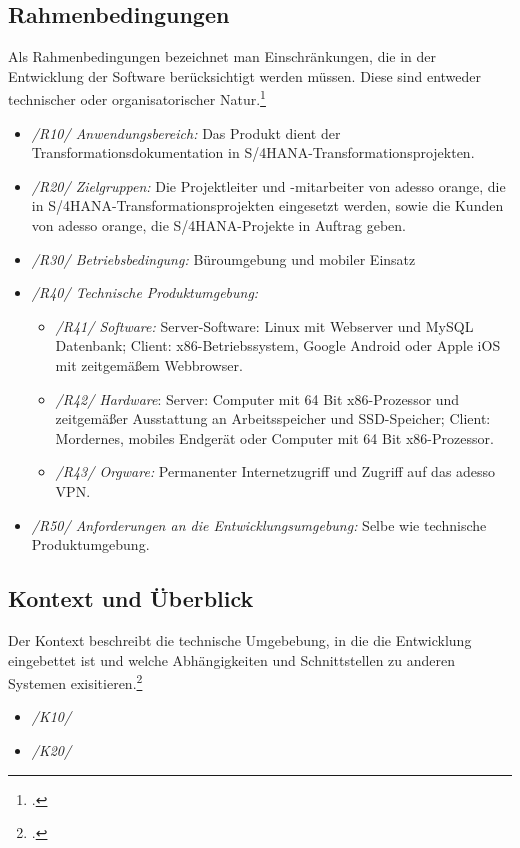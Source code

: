\subsection{Rahmenbedingungen}
Als Rahmenbedingungen bezeichnet man Einschränkungen, die in der Entwicklung der Software berücksichtigt werden müssen. Diese sind entweder technischer oder organisatorischer Natur.\footcite[Vgl.][S. 459 f.]{balzert}
\begin{itemize}
    \item[] \emph{/R10/ Anwendungsbereich:} Das Produkt dient der Transformationsdokumentation in S/4HANA-Transformationsprojekten.
    \item[] \emph{/R20/ Zielgruppen:} Die Projektleiter und -mitarbeiter von adesso orange, die in S/4HANA-Transformationsprojekten eingesetzt werden, sowie die Kunden von adesso orange, die S/4HANA-Projekte in Auftrag geben.
    \item[] \emph{/R30/ Betriebsbedingung:} Büroumgebung und mobiler Einsatz
    \item[] \emph{/R40/ Technische Produktumgebung:} 
    \begin{itemize}
        \item [] \emph{/R41/ Software:} Server-Software: Linux mit Webserver und MySQL Datenbank; Client: x86-Betriebssystem, Google Android oder Apple iOS mit zeitgemäßem Webbrowser.
        \item [] \emph{/R42/ Hardware}: Server: Computer mit 64 Bit x86-Prozessor und zeitgemäßer Ausstattung an Arbeitsspeicher und SSD-Speicher; Client: Mordernes, mobiles Endgerät oder Computer mit 64 Bit x86-Prozessor.
        \item [] \emph{/R43/ Orgware:} Permanenter Internetzugriff und Zugriff auf das adesso VPN.
    \end{itemize}
    \item[] \emph{/R50/ Anforderungen an die Entwicklungsumgebung:} Selbe wie technische Produktumgebung.
\end{itemize}

\subsection{Kontext und Überblick}
Der Kontext beschreibt die technische Umgebebung, in die die Entwicklung eingebettet ist und welche Abhängigkeiten und Schnittstellen zu anderen Systemen exisitieren.\footcite[Vgl.][S. 461 f.]{balzert} 
\begin{itemize}
    \item[] \emph{/K10/}
    \item[] \emph{/K20/}
\end{itemize}

